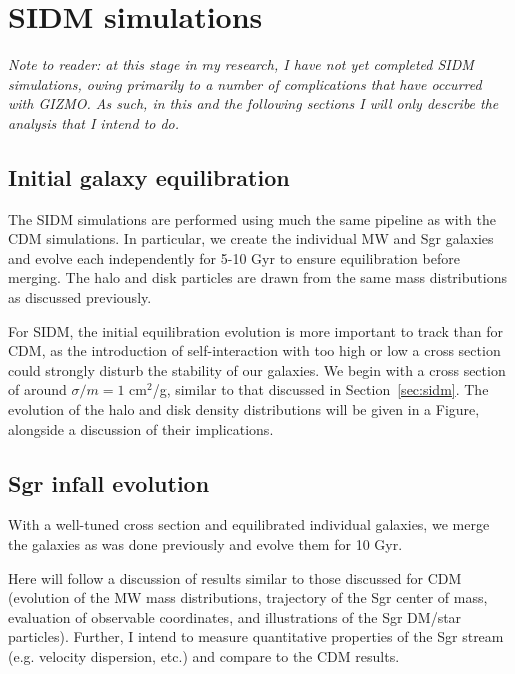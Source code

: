 \section{SIDM simulations}
\label{sec:sidm-sim}

\textit{%
    Note to reader: at this stage in my research, I have not yet completed SIDM
    simulations, owing primarily to a number of complications that have occurred
    with GIZMO. As such, in this and the following sections I will only
    describe the analysis that I intend to do.
}

\subsection{Initial galaxy equilibration}
The SIDM simulations are performed using much the same pipeline as with the CDM
simulations. In particular, we create the individual MW and Sgr galaxies and
evolve each independently for 5-10 Gyr to ensure equilibration before merging.
The halo and disk particles are drawn from the same mass distributions as
discussed previously.

For SIDM, the initial equilibration evolution is more important to track than
for CDM, as the introduction of self-interaction with too high or low a cross
section could strongly disturb the stability of our galaxies. We begin with a
cross section of around $\sigma / m = 1$ cm$^2$/g, similar to that discussed
in Section~\ref{sec:sidm}. The evolution of the halo and disk density
distributions will be given in a Figure, alongside a discussion of their
implications.

\subsection{Sgr infall evolution}
With a well-tuned cross section and equilibrated individual galaxies, we merge
the galaxies as was done previously and evolve them for 10 Gyr. 

Here will follow a discussion of results similar to those discussed for CDM
(evolution of the MW mass distributions, trajectory of the Sgr center of mass,
evaluation of observable coordinates, and illustrations of the Sgr DM/star
particles). Further, I intend to measure quantitative properties of the Sgr
stream (e.g. velocity dispersion, etc.) and compare to the CDM results.

